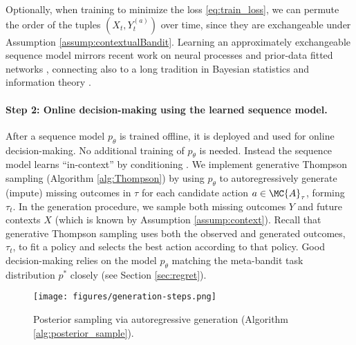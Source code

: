 Optionally, when training to minimize the loss \eqref{eq:train_loss}, we can permute the order of the tuples $(X_t, Y_t^{(a)})$ over time, since they are exchangeable under Assumption \ref{assump:contextualBandit}. Learning an approximately exchangeable sequence model mirrors recent work on neural processes \citep{garnelo2018neural,jha2022neural,NguyenGr22,lee2023martingale} and prior-data fitted networks \citep{MullerHoArGrHu22}, connecting also to a long tradition in Bayesian statistics and information theory \cite{dawid1984present, barron1998minimum}. 



\paragraph{Step 2: Online decision-making using the learned sequence model.}
\label{sec:online}
After a sequence model $p_\theta$ is trained offline, it is deployed and used for online decision-making. No additional training of $p_\theta$ is needed. Instead the sequence model learns ``in-context'' by conditioning \citep{brown2020language}. We implement generative Thompson sampling (Algorithm \ref{alg:Thompson}) by using $p_\theta$ to autoregressively generate (impute) missing outcomes in $\tau$ for each candidate action $a \in \MC{A}_{\tau}$, forming $\tau_t$. In the generation procedure, we sample both missing outcomes $Y$ and future contexts $X$ (which is known by Assumption \ref{assump:context}).
Recall that generative Thompson sampling uses both the observed and generated outcomes, $\tau_t$, to fit a policy and selects the best action according to that policy. 
Good decision-making relies on the model $p_\theta$ matching the meta-bandit task distribution $p^*$ closely (see Section \ref{sec:regret}). 


\begin{figure*}[h]
    \centering
    \texttt{[image: figures/generation-steps.png]}
    \caption{Posterior sampling via autoregressive generation (Algorithm \ref{alg:posterior_sample}). }
    \label{fig:autoregressive-generation}
\end{figure*}

